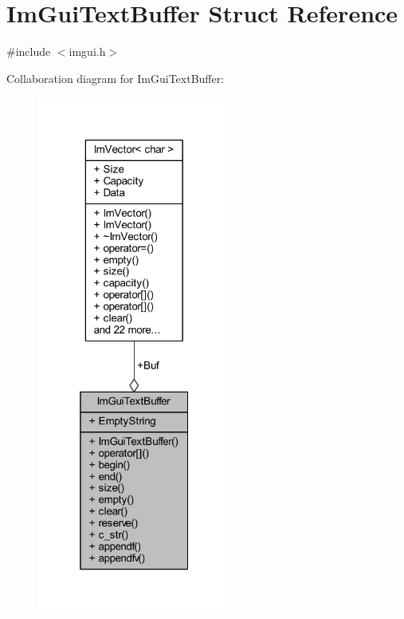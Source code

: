 \hypertarget{struct_im_gui_text_buffer}{}\section{Im\+Gui\+Text\+Buffer Struct Reference}
\label{struct_im_gui_text_buffer}


{\ttfamily \#include $<$imgui.\+h$>$}



Collaboration diagram for Im\+Gui\+Text\+Buffer\+:
\nopagebreak
\begin{figure}[H]
\begin{center}
\leavevmode
\includegraphics[width=181pt]{struct_im_gui_text_buffer__coll__graph}
\end{center}
\end{figure}
